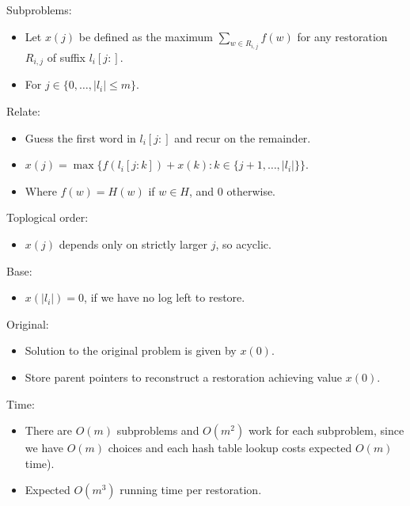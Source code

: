 \documentclass[12pt,twoside]{article}
\begin{document}
\begin{problems}
Subproblems:
\begin{itemize}
    \item Let $x(j)$ be defined as the maximum $\sum_{w\in R_{i,j}} f(w)$ for any restoration $R_{i,j}$ of suffix $l_i[j:]$.
    \item For $j \in \{0,\ldots,|l_i|\leq m\}$.
\end{itemize}

Relate:
\begin{itemize}
    \item Guess the first word in $l_i[j:]$ and recur on the remainder.
    \item $x(j)=\max\{f(l_i[j:k])+x(k):k \in \{j+1,\ldots,|l_i|\}\}$.
    \item Where $f(w)=H(w)$ if $w \in H$, and 0 otherwise.
\end{itemize}

Toplogical order:
\begin{itemize}
    \item $x(j)$ depends only on strictly larger $j$, so acyclic.
\end{itemize}

Base:
\begin{itemize}
    \item $x(|l_i|)=0$, if we have no log left to restore.
\end{itemize}

Original:
\begin{itemize}
    \item Solution to the original problem is given by $x(0)$.
    \item Store parent pointers to reconstruct a restoration achieving value $x(0)$.
\end{itemize}

Time:
\begin{itemize}
    \item There are $O(m)$ subproblems and $O(m^2)$ work for each subproblem, since we have $O(m)$ choices and each hash table lookup costs expected $O(m)$ time).
    \item Expected $O(m^3)$ running time per restoration.
\end{itemize}

\end{problems}
\end{document}
